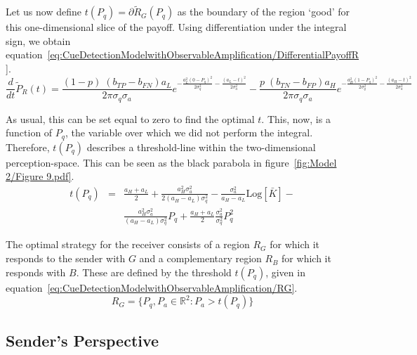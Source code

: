 \documentclass[a4paper,12pt]{article}
\numberwithin{equation}{section}
\begin{document}
Let us now define $t(P_{q})=\partial \tilde{R}_{G}(P_{q})$ as the boundary of the region `good' for this \mbox{one-dimensional} slice of the payoff. Using differentiation under the integral sign, we obtain equation~\ref{eq:CueDetectionModelwithObservableAmplification/DifferentialPayoffR}.
\begin{equation}
\label{eq:CueDetectionModelwithObservableAmplification/DifferentialPayoffR}
\frac{d}{dt}\tilde{P}_{R}(t)= \frac{(1-p) \; (b_{TP}-b_{FN}) a_{L}}{2 \pi \sigma_{q} \sigma_{a}} e^{-\frac{a_{L}^{2} (0-P_{q})^2}{2 \sigma_{q}^2}-\frac{(a_{L}-t)^2}{2 \sigma_{a}^2}} - \frac{p \; (b_{TN}-b_{FP}) a_{H}}{2 \pi \sigma_{q} \sigma_{a}} e^{-\frac{a_{H}^{2} (1-P_{q})^2}{2 \sigma_{q}^2}-\frac{(a_{H}-t)^2}{2 \sigma_{a}^2}}
\end{equation}

As usual, this can be set equal to zero to find the optimal $t$. This, now, is a function of $P_{q}$, the variable over which we did not perform the integral. Therefore, $t(P_{q})$ describes a threshold-line within the two-dimensional perception-space. This can be seen as the black parabola in figure~\ref{fig:Model 2/Figure 9.pdf}.
\begin{equation}
\label{eq:CueDetectionModelwithObservableAmplification/Threshold}
\begin{array}{rcl}
t(P_{q})&=&\displaystyle \frac{a_{H} + a_{L}}{2} + \frac{a_{H}^{2}\sigma_{a}^{2}}{2 (a_{H} - a_{L}) \sigma_{q}^{2}} - \frac{\sigma_{a}^{2}}{a_{H} - a_{L}} \text{Log} [\bar{K}] -\\
&&\displaystyle \frac{a_{H}^2 \sigma_{a}^2}{(a_{H} - a_{L}) \sigma_{q}^2} P_{q} + \frac{a_{H}+a_{L}}{2} \frac{\sigma_{a}^2}{\sigma_{q}^2} P_{q}^{2}
\end{array}
\end{equation}

The optimal strategy for the receiver consists of a region $R_{G}$ for which it responds to the sender with $G$ and a complementary region $R_{B}$ for which it responds with $B$. These are defined by the threshold $t(P_{q})$, given in equation~\ref{eq:CueDetectionModelwithObservableAmplification/RG}.
\begin{equation}
\label{eq:CueDetectionModelwithObservableAmplification/RG}
R_{G} = \{P_{q}, P_{a} \in \mathbb{R}^{2} : P_{a}>t(P_{q})\}
\end{equation}


\subsection{Sender's Perspective}
\label{sec:CueDetectionModelwithObservableAmplification/Sender's Perspective}
\end{document}
